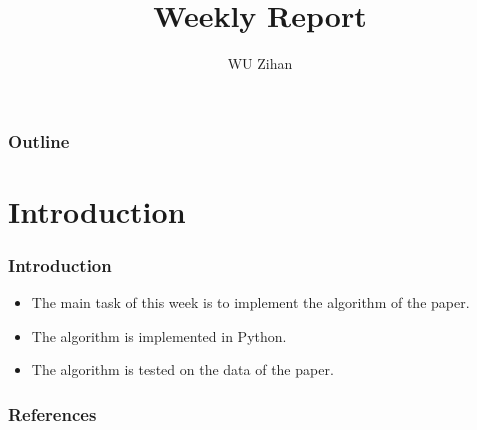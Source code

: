 \documentclass{beamer}
\title{Weekly Report}
\author{WU Zihan}
\begin{document}
\maketitle
\begin{frame}
    \frametitle{Outline}
    \tableofcontents
\end{frame}

\section{Introduction}
\begin{frame}
    \frametitle{Introduction}
    \begin{itemize}
        \item The main task of this week is to implement the algorithm of the paper.  \cite{yan2017CoclusteringMultidimensionalBig}
        \item The algorithm is implemented in Python.
        \item The algorithm is tested on the data of the paper.
    \end{itemize}
\end{frame}

\begin{frame}[allowframebreaks]
    \frametitle{References}
    \printbibliography
\end{frame}
\end{document}
